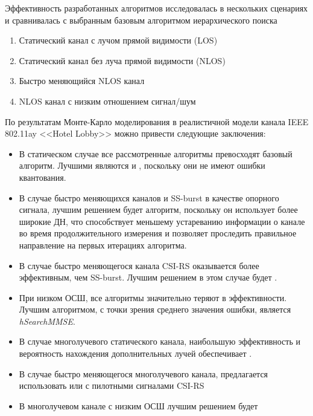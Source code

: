 Эффективность разработанных алгоритмов исследовалась в нескольких сценариях и сравнивалась 
с выбранным базовым алгоритмом иерархического поиска
\begin{enumerate}
    \item Статический канал с лучом прямой видимости (LOS)
    \item Статический канал без луча прямой видимости (NLOS)
    \item Быстро меняющийся NLOS канал 
    \item NLOS канал с низким отношением сигнал/шум 
\end{enumerate}
По результатам Монте-Карло моделирования в реалистичной модели канала
IEEE 802.11ay <<Hotel Lobby>> можно привести следующие заключения: 
\begin{itemize}
    \item В статическом случае все рассмотренные алгоритмы превосходят
    базовый алгоритм. Лучшими являются \AuxBeam{} и \hSearchMMSE{}, 
    поскольку они не имеют ошибки квантования. 
    \item В случае быстро меняющихся каналов и SS-burst в качестве опорного
    сигнала, лучшим решением будет \ACS{} алгоритм, поскольку он
    использует более широкие ДН, что способствует меньшему устареванию
    информации о канале во время продолжительного измерения и позволяет
    проследить правильное направление на первых итерациях алгоритма. 
    \item В случае быстро меняющегося канала CSI-RS оказывается более 
    эффективным, чем SS-burst. Лучшим решением в этом случае будет \AuxBeam{}.
    \item При низком ОСШ, все алгоритмы значительно теряют в эффективности. Лучшим 
    алгоритмом, с точки зрения среднего значения ошибки, является \textit{hSearchMMSE}.
    \item В случае многолучевого статического канала, наибольшую эффективность 
    и вероятность нахождения дополнительных лучей обеспечивает \hSearchMMSE{}.
    \item В случае быстро меняющегося многолучевого канала, предлагается использовать
    \AuxBeam{} или \hSearchMMSE{} с пилотными сигналами CSI-RS 
    \item В многолучевом канале с низким ОСШ лучшим решением будет \hSearchMMSE{}
\end{itemize}

